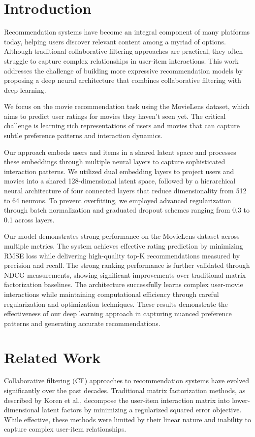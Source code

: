 \documentclass[sigconf]{acmart}
\begin{document}
\section{Introduction}
Recommendation systems have become an integral component of many platforms today, helping users discover relevant content among a myriad of options. Although traditional collaborative filtering approaches are practical, they often struggle to capture complex relationships in user-item interactions. This work addresses the challenge of building more expressive recommendation models by proposing a deep neural architecture that combines collaborative filtering with deep learning.

We focus on the movie recommendation task using the MovieLens dataset, which aims to predict user ratings for movies they haven't seen yet. The critical challenge is learning rich representations of users and movies that can capture subtle preference patterns and interaction dynamics.

Our approach embeds users and items in a shared latent space and processes these embeddings through multiple neural layers to capture sophisticated interaction patterns. We utilized dual embedding layers to project users and movies into a shared 128-dimensional latent space, followed by a hierarchical neural architecture of four connected layers that reduce dimensionality from 512 to 64 neurons. To prevent overfitting, we employed advanced regularization through batch normalization and graduated dropout schemes ranging from 0.3 to 0.1 across layers.

Our model demonstrates strong performance on the MovieLens dataset across multiple metrics. The system achieves effective rating prediction by minimizing RMSE loss while delivering high-quality top-K recommendations measured by precision and recall. The strong ranking performance is further validated through NDCG measurements, showing significant improvements over traditional matrix factorization baselines. The architecture successfully learns complex user-movie interactions while maintaining computational efficiency through careful regularization and optimization techniques. These results demonstrate the effectiveness of our deep learning approach in capturing nuanced preference patterns and generating accurate recommendations.



\section{Related Work}\label{sec:related}
Collaborative filtering (CF) approaches to recommendation systems have evolved significantly over the past decades. Traditional matrix factorization methods, as described by Koren et al.\cite{koren2009matrix}, decompose the user-item interaction matrix into lower-dimensional latent factors by minimizing a regularized squared error objective. While effective, these methods were limited by their linear nature and inability to capture complex user-item relationships.
\end{document}
